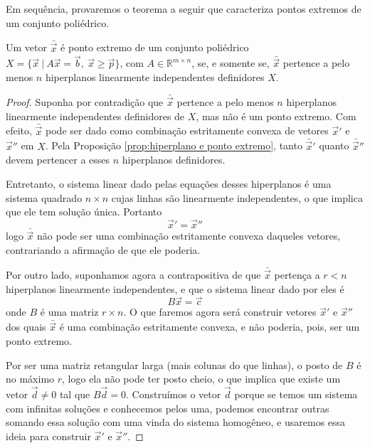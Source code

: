 Em sequência, provaremos o teorema a seguir que caracteriza pontos
extremos de um conjunto poliédrico.

\begin{thm:ponto extremo}
	\label{thm:ponto extremo}
	Um vetor $\bar{\vec{x}}$ é ponto extremo de um conjunto poliédrico
	$X = \{\vec{x}\ |\ A\vec{x} = \vec{b},\ \vec{x} \geq \vec{p}\}$, com
	$A \in \mathbb{R}^{m \times n}$, se, e somente se, $\bar{\vec{x}}$ pertence
	a pelo menos $n$ hiperplanos linearmente independentes definidores $X$.

	\begin{proof}
		Suponha por contradição que $\bar{\vec{x}}$ pertence a pelo menos $n$
		hiperplanos linearmente independentes definidores de $X$, mas não é um
		ponto extremo. Com efeito, $\bar{\vec{x}}$ pode ser dado como combinação
		estritamente convexa de vetores $\vec{x}'$ e $\vec{x}''$ em $X$.
		Pela Proposição \ref{prop:hiperplano e ponto extremo}, tanto
		$\bar{\vec{x}}'$ quanto $\bar{\vec{x}}''$ devem pertencer a esses $n$
		hiperplanos definidores.

		Entretanto, o sistema linear dado pelas equações desses hiperplanos é uma
		sistema quadrado $n \times n$ cujas linhas são linearmente independentes,
		o que implica que ele tem solução única. Portanto
		\[\vec{x}' = \vec{x}''\]logo $\bar{\vec{x}}$ não pode ser uma combinação
		estritamente convexa daqueles vetores, contrariando a afirmação de que
		ele poderia.

		Por outro lado, suponhamos agora a contrapositiva de que $\bar{\vec{x}}$
		pertença a $r < n$ hiperplanos linearmente independentes, e que o sistema
		linear dado por eles é \[B\vec{x} = \vec{c}\]onde $B$ é uma matriz
		$r \times n$. O que faremos agora será construir vetores $\vec{x}'$ e
		$\vec{x}''$ dos quais $\bar{\vec{x}}$ é uma combinação estritamente
		convexa, e não poderia, pois, ser um ponto extremo.

		Por ser uma matriz retangular larga (mais colunas do que linhas), o
		posto de $B$ é no máximo $r$, logo ela não pode ter posto cheio, o que
		implica que existe um vetor $\vec{d} \neq 0$ tal que $B \vec{d} = 0$.
		Construímos o vetor $\vec{d}$ porque se temos um sistema com infinitas
		soluções e conhecemos pelos uma, podemos encontrar outras somando essa
		solução com uma vinda do sistema homogêneo, e usaremos essa ideia para
		construir $\vec{x}'$ e $\vec{x}''$.


\end{proof}
\end{thm:ponto extremo}
